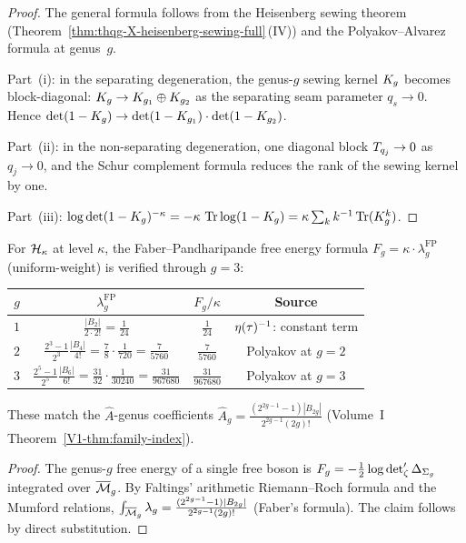 \begin{proof}
The general formula follows from the Heisenberg sewing theorem
(Theorem~\ref{thm:thqg-X-heisenberg-sewing-full}\,(IV)) and
the Polyakov--Alvarez formula at genus~$g$.

Part~(i): in the separating degeneration, the genus-$g$
sewing kernel $K_g$ becomes block-diagonal:
$K_g \to K_{g_1} \oplus K_{g_2}$
as the separating seam parameter $q_s \to 0$.
Hence $\det(1 - K_g) \to
\det(1 - K_{g_1}) \cdot \det(1 - K_{g_2})$.

Part~(ii): in the non-separating degeneration, one diagonal
block $T_{q_j} \to 0$ as $q_j \to 0$, and the Schur
complement formula reduces the rank of the sewing kernel by one.

Part~(iii): $\log\det(1-K_g)^{-\kappa}
= -\kappa\,\operatorname{Tr}\log(1-K_g)
= \kappa\sum_{k} k^{-1}\operatorname{Tr}(K_g^k)$.
\end{proof}

\begin{proposition}%
%
For $\mathcal{H}_\kappa$ at level $\kappa$, the Faber--Pandharipande
free energy formula
$F_g = \kappa \cdot \lambda_g^{\mathrm{FP}}$ \textup{(}uniform-weight\textup{)} is verified
through $g = 3$:
\begin{center}
\begin{tabular}{c|c|c|c}
$g$ & $\lambda_g^{\mathrm{FP}}$ & $F_g/\kappa$ & Source \\
\hline
$1$ & $\frac{|B_2|}{2 \cdot 2!} = \frac{1}{24}$ & $\frac{1}{24}$
& $\eta(\tau)^{-1}$: constant term \\[4pt]
$2$ & $\frac{2^3-1}{2^3}\frac{|B_4|}{4!}
= \frac{7}{8}\cdot\frac{1}{720}
= \frac{7}{5760}$ & $\frac{7}{5760}$
& Polyakov at $g = 2$ \\[4pt]
$3$ & $\frac{2^5-1}{2^5}\frac{|B_6|}{6!}
= \frac{31}{32}\cdot\frac{1}{30240}
= \frac{31}{967680}$ & $\frac{31}{967680}$
& Polyakov at $g = 3$
\end{tabular}
\end{center}
These match the $\hat{A}$-genus coefficients
$\hat{A}_g = \frac{(2^{2g-1}-1)|B_{2g}|}{2^{2g-1}(2g)!}$
(Volume~I Theorem~\textup{\ref{V1-thm:family-index}}).
\end{proposition}

\begin{proof}
The genus-$g$ free energy of a single free boson is
$F_g = -\frac{1}{2}\log\det\nolimits'_\zeta\Delta_{\Sigma_g}$
integrated over $\overline{\mathcal{M}}_g$. By Faltings'
arithmetic Riemann--Roch formula and the Mumford relations,
$\int_{\overline{\mathcal{M}}_g} \lambda_g
= \frac{(2^{2g-1}-1)|B_{2g}|}{2^{2g-1}(2g)!}$
(Faber's formula). The claim follows by direct substitution.
\end{proof}


